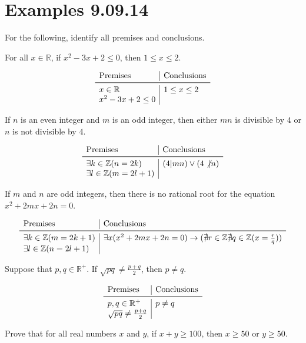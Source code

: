 \documentclass{article}
\begin{document}
\section*{Examples 9.09.14}

For the following, identify all premises and conclusions.

For all $x\in\mathbb{R}$, if $x^2-3x+2\le{}0$, then $1\le{}x\le{}2$.

\[
\begin{array}{l|l}
\text{Premises} & \text{Conclusions} \\
\midrule
x\in\mathbb{R} & 1\le x\le 2 \\
x^2-3x+2\le 0 & \\
\end{array}
\]

If $n$ is an even integer and $m$ is an odd integer, then either $mn$
is divisible by $4$ or $n$ is not divisible by $4$.

\[
\begin{array}{l|l}
\text{Premises} & \text{Conclusions} \\
\midrule
\exists k\in\mathbb{Z}(n=2k) & (4|mn)\vee(4\not|n) \\
\exists l\in\mathbb{Z}(m=2l+1) & \\
\end{array}
\]

If $m$ and $n$ are odd integers, then there is no rational root for
the equation $x^2+2mx+2n=0$.

\[
\begin{array}{l|l}
\text{Premises} & \text{Conclusions} \\
\midrule
\exists k\in\mathbb{Z}(m=2k+1) & \exists{}x(x^2+2mx+2n=0)\rightarrow(\nexists r\in\mathbb{Z}\nexists q\in\mathbb{Z}(x=\frac{r}{q})) \\
\exists l\in\mathbb{Z}(n=2l+1) & \\
\end{array}
\]

Suppose that $p,q\in\mathbb{R}^+$. If $\sqrt{pq}\ne\frac{p+q}{2}$,
then $p\ne{}q$.

\[
\begin{array}{l|l}
\text{Premises} & \text{Conclusions} \\
\midrule
p,q\in\mathbb{R}^+ & p\ne q \\
\sqrt{pq}\ne\frac{p+q}{2} & \\
\end{array}
\]

Prove that for all real numbers $x$ and $y$, if $x+y\ge{}100$, then
$x\ge{}50$ or $y\ge{}50$.
\end{document}
